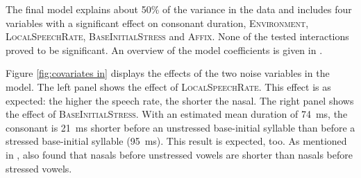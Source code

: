 The final model explains about 50\% of the variance in the data and includes four variables with a significant effect on consonant duration, \textsc{Environment}, \textsc{LocalSpeechRate}, \textsc{BaseInitialStress} and \textsc{Affix}. None of the tested interactions proved to be significant. 
An overview of the model coefficients is given in .%

\clearpage

\begin{table}

	\caption{ Summary of linear model for variables predicting the Box-Cox-transformed duration of [m] in prefixed words}
	\label{tbl: summary model2}
	
	
\vspace*{-0.4cm}
\end{table}


Figure \ref{fig:covariates in} displays the effects of the two noise variables in the model. The left panel shows the effect of  \textsc{LocalSpeechRate}. This effect is as expected: 
the higher the speech rate, the shorter the nasal. The right panel shows the effect of \textsc{BaseInitialStress}. With an estimated mean duration of 74~ms, the consonant is 21~ms shorter before an unstressed base-initial syllable than before a stressed base-initial syllable (95~ms). This result is expected, too. As mentioned in , \cite{Umeda.1977} also found that nasals before unstressed vowels are shorter than nasals before stressed vowels.

